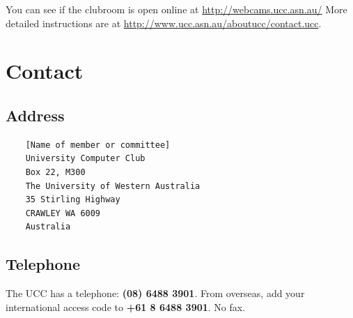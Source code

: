 You can see if the clubroom is open online at \url{http://webcams.ucc.asn.au/}
More detailed instructions are at \url{http://www.ucc.asn.au/aboutucc/contact.ucc}.

\section{Contact}

\subsection{Address}

\begin{verbatim}
	[Name of member or committee]
	University Computer Club
	Box 22, M300
	The University of Western Australia
	35 Stirling Highway
	CRAWLEY WA 6009
	Australia
\end{verbatim}


\subsection{Telephone}
The UCC has a telephone: {\bf (08) 6488 3901}. From overseas, add your international access code to {\bf +61 8 6488 3901}. No fax.

